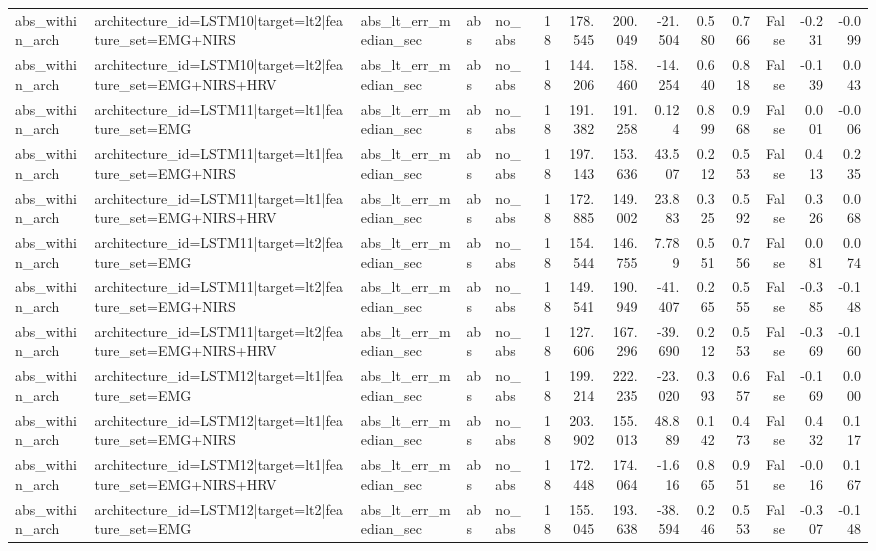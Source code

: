 \begin{table}
\begin{tabular}{lllllrrrrrrrrr}
abs_within_arch & architecture_id=LSTM10|target=lt2|feature_set=EMG+NIRS & abs_lt_err_median_sec & abs & no_abs & 18 & 178.545 & 200.049 & -21.504 & 0.580 & 0.766 & False & -0.231 & -0.099 \\
abs_within_arch & architecture_id=LSTM10|target=lt2|feature_set=EMG+NIRS+HRV & abs_lt_err_median_sec & abs & no_abs & 18 & 144.206 & 158.460 & -14.254 & 0.640 & 0.818 & False & -0.139 & 0.043 \\
abs_within_arch & architecture_id=LSTM11|target=lt1|feature_set=EMG & abs_lt_err_median_sec & abs & no_abs & 18 & 191.382 & 191.258 & 0.124 & 0.899 & 0.968 & False & 0.001 & -0.006 \\
abs_within_arch & architecture_id=LSTM11|target=lt1|feature_set=EMG+NIRS & abs_lt_err_median_sec & abs & no_abs & 18 & 197.143 & 153.636 & 43.507 & 0.212 & 0.553 & False & 0.413 & 0.235 \\
abs_within_arch & architecture_id=LSTM11|target=lt1|feature_set=EMG+NIRS+HRV & abs_lt_err_median_sec & abs & no_abs & 18 & 172.885 & 149.002 & 23.883 & 0.325 & 0.592 & False & 0.326 & 0.068 \\
abs_within_arch & architecture_id=LSTM11|target=lt2|feature_set=EMG & abs_lt_err_median_sec & abs & no_abs & 18 & 154.544 & 146.755 & 7.789 & 0.551 & 0.756 & False & 0.081 & 0.074 \\
abs_within_arch & architecture_id=LSTM11|target=lt2|feature_set=EMG+NIRS & abs_lt_err_median_sec & abs & no_abs & 18 & 149.541 & 190.949 & -41.407 & 0.265 & 0.555 & False & -0.385 & -0.148 \\
abs_within_arch & architecture_id=LSTM11|target=lt2|feature_set=EMG+NIRS+HRV & abs_lt_err_median_sec & abs & no_abs & 18 & 127.606 & 167.296 & -39.690 & 0.212 & 0.553 & False & -0.369 & -0.160 \\
abs_within_arch & architecture_id=LSTM12|target=lt1|feature_set=EMG & abs_lt_err_median_sec & abs & no_abs & 18 & 199.214 & 222.235 & -23.020 & 0.393 & 0.657 & False & -0.169 & 0.000 \\
abs_within_arch & architecture_id=LSTM12|target=lt1|feature_set=EMG+NIRS & abs_lt_err_median_sec & abs & no_abs & 18 & 203.902 & 155.013 & 48.889 & 0.142 & 0.473 & False & 0.432 & 0.117 \\
abs_within_arch & architecture_id=LSTM12|target=lt1|feature_set=EMG+NIRS+HRV & abs_lt_err_median_sec & abs & no_abs & 18 & 172.448 & 174.064 & -1.616 & 0.865 & 0.951 & False & -0.016 & 0.167 \\
abs_within_arch & architecture_id=LSTM12|target=lt2|feature_set=EMG & abs_lt_err_median_sec & abs & no_abs & 18 & 155.045 & 193.638 & -38.594 & 0.246 & 0.553 & False & -0.307 & -0.148 \\

\end{tabular}
\end{table}
